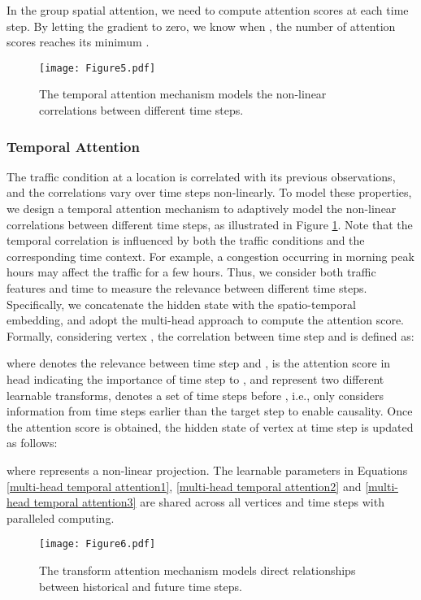 \documentclass[letterpaper]{article} \usepackage{aaai20}  \usepackage{times}  \usepackage{helvet} \usepackage{courier}  \usepackage[hyphens]{url}  \usepackage{graphicx} \usepackage{amsmath}
\begin{document}
In the group spatial attention, we need to compute  attention scores at each time step. By letting the gradient to zero, we know when , the number of attention scores reaches its minimum .

\begin{figure}
	\centering
	\texttt{[image: Figure5.pdf]} \\
	\caption{The temporal attention mechanism models the non-linear correlations between different time steps.}
	\label{Figure5}
\end{figure}

\subsubsection{Temporal Attention}

The traffic condition at a location is correlated with its previous observations, and the correlations vary over time steps non-linearly. To model these properties, we design a temporal attention mechanism to adaptively model the non-linear correlations between different time steps, as illustrated in Figure \ref{Figure5}. Note that the temporal correlation is influenced by both the traffic conditions and the corresponding time context. For example, a congestion occurring in morning peak hours may affect the traffic for a few hours. Thus, we consider both traffic features and time to measure the relevance between different time steps. Specifically, we concatenate the hidden state with the spatio-temporal embedding, and adopt the multi-head approach to compute the attention score. Formally, considering vertex , the correlation between time step  and  is defined as:


where  denotes the relevance between time step  and ,   is the attention score in  head indicating the importance of time step  to ,  and  represent two different learnable transforms,  denotes a set of time steps before , i.e., only considers information from time steps earlier than the target step to enable causality. Once the attention score is obtained, the hidden state of vertex  at time step  is updated as follows:

where  represents a non-linear projection. The learnable parameters in Equations \ref{multi-head temporal attention1}, \ref{multi-head temporal attention2} and \ref{multi-head temporal attention3} are shared across all vertices and time steps with paralleled computing.

\begin{figure}
	\centering
	\texttt{[image: Figure6.pdf]} \\
	\caption{The transform attention mechanism models direct relationships between historical  and future time steps.}
	\label{Figure6}
\end{figure}
\end{document}
